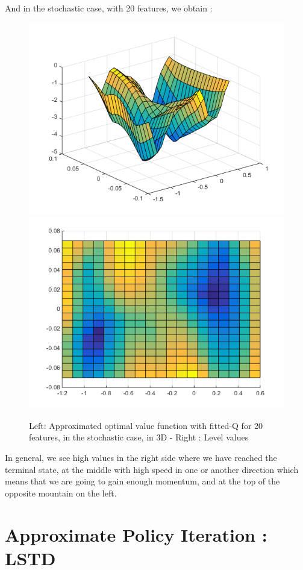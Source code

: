 \documentclass[a4paper, 12pt]{article}
\begin{document}
And in the stochastic case, with 20 features, we obtain :
\begin{figure}[H]
	\centering
	\noindent\includegraphics[scale=0.3]{fittedQ-5ep-5000draws-stochastic.png}
	\noindent\includegraphics[scale=0.3]{fittedQ-5ep-5000draws-stochastic-levels.png}
	\caption{Left: Approximated optimal value function with fitted-Q for 20 features, in the stochastic case, in 3D - Right : Level values}
\end{figure}

In general, we see high values in the right side where we have reached the terminal state, at the middle with high speed in one or another direction which means that we are going to gain enough momentum, and at the top of the opposite mountain on the left.

\section{Approximate Policy Iteration : LSTD}
\end{document}
